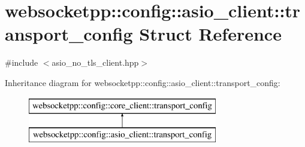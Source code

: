 \hypertarget{structwebsocketpp_1_1config_1_1asio__client_1_1transport__config}{}\section{websocketpp\+:\+:config\+:\+:asio\+\_\+client\+:\+:transport\+\_\+config Struct Reference}
\label{structwebsocketpp_1_1config_1_1asio__client_1_1transport__config}


{\ttfamily \#include $<$asio\+\_\+no\+\_\+tls\+\_\+client.\+hpp$>$}

Inheritance diagram for websocketpp\+:\+:config\+:\+:asio\+\_\+client\+:\+:transport\+\_\+config\+:\begin{figure}[H]
\begin{center}
\leavevmode
\includegraphics[height=2.000000cm]{structwebsocketpp_1_1config_1_1asio__client_1_1transport__config}
\end{center}
\end{figure}
